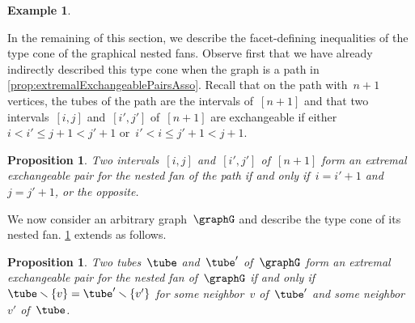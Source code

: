 \documentclass{amsart}
\newtheorem{proposition}[theorem]{Proposition}
\theoremstyle{definition}
\newtheorem{example}[theorem]{Example}
\newcommand{\ssm}{\smallsetminus} %
\begin{document}
\begin{example}
\medskip
\end{example}

In the remaining of this section, we describe the facet-defining inequalities of the type cone of the graphical nested fans.
Observe first that we have already indirectly described this type cone when the graph is a path in \cref{prop:extremalExchangeablePairsAsso}.
Recall that on the path with~$n+1$ vertices, the tubes of the path are the intervals of~$[n+1]$ and that two intervals~$[i,j]$ and~$[i',j']$ of~$[n+1]$ are exchangeable if either~${i < i' \le j+1 < j'+1}$ or~${i' < i \le j'+1 < j+1}$.

\begin{proposition}
\label{prop:extremalExchangeablePairsA}
Two intervals~$[i,j]$ and~$[i',j']$ of~$[n+1]$ form an extremal exchangeable pair for the nested fan of the path if and only if~$i = i'+1$ and~$j = j'+1$, or the opposite.
\end{proposition}

We now consider an arbitrary graph~$\graphG$ and describe the type cone of its nested fan.
\cref{prop:extremalExchangeablePairsA} extends as follows.

\begin{proposition}
\label{prop:extremalExchangeablePairsGA}
Two tubes~$\tube$ and~$\tube'$ of~$\graphG$ form an extremal exchangeable pair for the nested fan of~$\graphG$ if and only if~${\tube \ssm \{v\} = \tube' \ssm \{v'\}}$ for some neighbor~$v$ of~$\tube'$ and some neighbor~$v'$ of~$\tube$.
\end{proposition}
\end{document}

